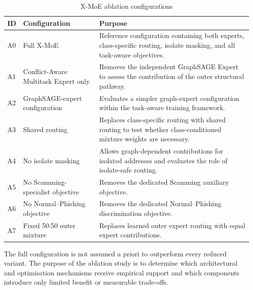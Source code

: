 \documentclass{ieeeaccess}
\begin{document}
\begin{table}[t]
\centering
\caption{X-MoE ablation configurations}
\label{tab:ablation_design}

\renewcommand{\arraystretch}{1.12}
\setlength{\tabcolsep}{5pt}
\scriptsize

\begin{tabularx}{\textwidth}{
>{\centering\arraybackslash}p{0.9cm}
>{\raggedright\arraybackslash}p{4.2cm}
>{\raggedright\arraybackslash}X
}
\toprule
\textbf{ID} &
\textbf{Configuration} &
\textbf{Purpose} \\
\midrule

A0
&
Full X-MoE
&
Reference configuration containing both experts, class-specific routing, isolate masking, and all task-aware objectives.
\\[2pt]

A1
&
Conflict-Aware Multitask Expert only
&
Removes the independent GraphSAGE Expert to assess the contribution of the outer structural pathway.
\\[2pt]

A2
&
GraphSAGE-expert configuration
&
Evaluates a simpler graph-expert configuration within the task-aware training framework.
\\[2pt]

A3
&
Shared routing
&
Replaces class-specific routing with shared routing to test whether class-conditioned mixture weights are necessary.
\\[2pt]

A4
&
No isolate masking
&
Allows graph-dependent contributions for isolated addresses and evaluates the role of isolate-safe routing.
\\[2pt]

A5
&
No Scamming-specialist objective
&
Removes the dedicated Scamming auxiliary objective.
\\[2pt]

A6
&
No Normal--Phishing objective
&
Removes the dedicated Normal--Phishing discrimination objective.
\\[2pt]

A7
&
Fixed 50:50 outer mixture
&
Replaces learned outer expert routing with equal expert contributions.
\\

\bottomrule
\end{tabularx}
\end{table}

The full configuration is not assumed a priori to outperform every reduced variant. The purpose of the ablation study is to determine which architectural and optimisation mechanisms receive empirical support and which components introduce only limited benefit or measurable trade-offs.
\end{document}
